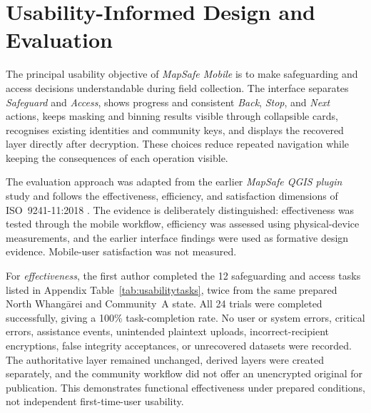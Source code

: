 \documentclass[]{interact}
\begin{document}
%


\section{Usability-Informed Design and Evaluation}
\label{sec:usability-design}

The principal usability objective of \textit{MapSafe Mobile} is to make safeguarding and access decisions understandable during field collection. The interface separates \emph{Safeguard} and \emph{Access}, shows progress and consistent \emph{Back}, \emph{Stop}, and \emph{Next} actions, keeps masking and binning results visible through collapsible cards, recognises existing identities and community keys, and displays the recovered layer directly after decryption. These choices reduce repeated navigation while keeping the consequences of each operation visible.

The evaluation approach was adapted from the earlier \textit{MapSafe QGIS plugin} study \citep{sharma2025mapsafe} and follows the effectiveness, efficiency, and satisfaction dimensions of ISO~9241-11:2018 \citep{ISO2018ergonomics}. The evidence is deliberately distinguished: effectiveness was tested through the mobile workflow, efficiency was assessed using physical-device measurements, and the earlier interface findings were used as formative design evidence. Mobile-user satisfaction was not measured.

For \textit{effectiveness}, the first author completed the 12 safeguarding and access tasks listed in Appendix Table~\ref{tab:usabilitytasks}, twice from the same prepared North Whang\={a}rei and Community~A state. All 24 trials were completed successfully, giving a 100\% task-completion rate. No user or system errors, critical errors, assistance events, unintended plaintext uploads, incorrect-recipient encryptions, false integrity acceptances, or unrecovered datasets were recorded. The authoritative layer remained unchanged, derived layers were created separately, and the community workflow did not offer an unencrypted original for publication. This demonstrates functional effectiveness under prepared conditions, not independent first-time-user usability.
\end{document}
